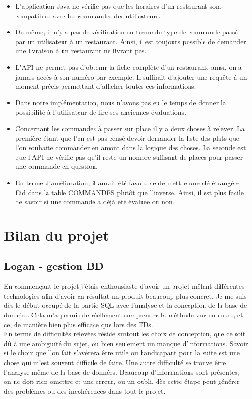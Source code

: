 \documentclass[10pt, a4paper]{article}
\begin{document}
\begin{itemize}
    \item L'application Java ne vérifie pas que les horaires d'un restaurant sont compatibles avec les commandes des utilisateurs.
    \item De même, il n'y a pas de vérification en terme de type de commande passé par un utilisateur à un restaurant. Ainsi, il est toujours possible de demander une livraison à un restaurant ne livrant pas.
    \item L'API ne permet pas d'obtenir la fiche complète d'un restaurant, ainsi, on a jamais accès à son numéro par exemple. Il suffirait d'ajouter une requête à un moment précis permettant d'afficher toutes ces informations.
    \item Dans notre implémentation, nous n'avons pas eu le temps de donner la possibilité à l'utilisateur de lire ses anciennes évaluations.
    \item Concernant les commandes à passer sur place il y a deux choses à relever. La première étant que l'on est pas censé devoir demander la liste des plats que l'on souhaite commander en amont dans la logique des choses. La seconde est que l'API ne vérifie pas qu'il reste un nombre suffisant de places pour passer une commande en question.
    \item En terme d'amélioration, il aurait été favorable de mettre une clé étrangère Eid dans la table COMMANDES plutôt que l'inverse. Ainsi, il est plus facile de savoir si une commande a déjà été évaluée ou non.
\end{itemize}

\section{Bilan du projet}

\subsection{Logan - gestion BD}

En commençant le projet j'étais enthousiaste d'avoir un projet mêlant différentes
technologies afin d'avoir en résultat un produit beaucoup plus concret. Je me suis dès le
début occupé de la partie SQL avec l'analyse et la conception de la base de données. Cela m'a
permis de réellement comprendre la méthode vue en cours, et ce, de manière bien plus efficace
que lors des TDs.\\

En terme de difficultés relevées réside surtout les choix de conception, que ce soit dû à une
ambiguïté du sujet, ou bien seulement un manque d'informations. Savoir si le choix que l'on fait
s'avérera être utile ou handicapant pour la suite est une chose qui m'est souvent difficile de
faire. Une autre difficulté se trouve être l'analyse même de la base de données. Beaucoup
d'informations sont présentes, on ne doit rien omettre et une erreur, ou un oubli, dès cette
étape peut générer des problèmes ou des incohérences dans tout le projet.
\end{document}

